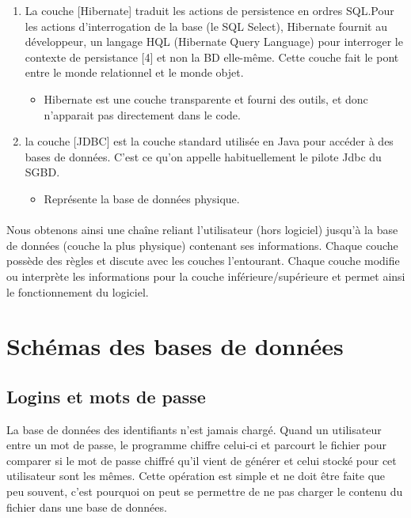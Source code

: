 \begin{enumerate}
\item La couche [Hibernate] traduit les actions de persistence en ordres SQL.Pour les actions d'interrogation de la base (le SQL Select), Hibernate fournit au développeur, un langage HQL (Hibernate Query Language) pour interroger le contexte de persistance [4] et non la BD elle-même. Cette couche fait le pont entre le monde relationnel et le monde objet.
\begin{itemize}
\item Hibernate est une couche transparente et fourni des outils, et donc n'apparait pas directement dans le code.
\end{itemize}

\item la couche [JDBC] est la couche standard utilisée en Java pour accéder à des bases de données. C'est ce qu'on appelle habituellement le pilote Jdbc du SGBD.
\begin{itemize}
\item Représente la base de données physique.
\end{itemize}

\end{enumerate}

\paragraph*{}
Nous obtenons ainsi une chaîne reliant l'utilisateur (hors logiciel) jusqu'à la base de données (couche la plus physique) contenant ses informations. Chaque couche possède des règles et discute avec les couches l'entourant. Chaque couche modifie ou interprète les informations pour la couche inférieure/supérieure et permet ainsi le fonctionnement du logiciel.


\section{Schémas des bases de données}
	
	\subsection{Logins et mots de passe}

	La base de données des identifiants n'est jamais chargé. Quand un utilisateur entre un mot de passe, le programme chiffre celui-ci et parcourt le fichier pour comparer si le mot de passe chiffré qu'il vient de générer et celui stocké pour cet utilisateur sont les mêmes. Cette opération est simple et ne doit être faite que peu souvent, c'est pourquoi on peut se permettre de ne pas charger le contenu du fichier dans une base de données.

